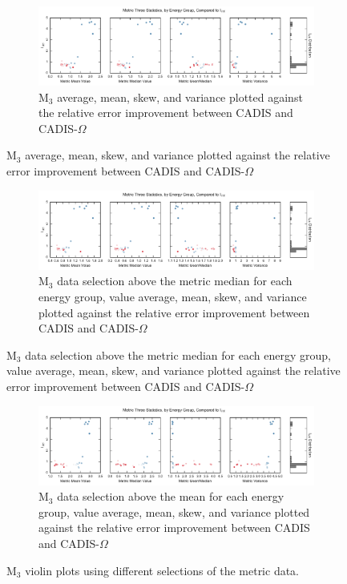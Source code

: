 \begin{figure}[htb]
  \centering
  \begin{subfigure}[t]{\textwidth}
    \centering
    \includegraphics[width=\linewidth]{./chapters/characterization_probs/figures/sample_data/metric_three_err_stats_full.pdf}
    \caption{M$_3$ average, mean, skew, and variance plotted against the
    relative error improvement between CADIS and CADIS-$\Omega$}
    \label{fig:samplestatsfullM3}
  \end{subfigure}
\end{figure}
\begin{figure}[htb]\ContinuedFloat
  \centering
  \begin{subfigure}[t]{\textwidth}
    \centering
    \includegraphics[width=\linewidth]{./chapters/characterization_probs/figures/sample_data/metric_three_err_stats_median.pdf}
    \caption{M$_3$ data selection above the metric median for each energy group,
      value average, mean, skew, and variance plotted against the
    relative error improvement between CADIS and CADIS-$\Omega$}
    \label{fig:samplestatsfullM3}
  \end{subfigure}
\end{figure}
\begin{figure}[htb]\ContinuedFloat
  \centering
  \begin{subfigure}[t]{\textwidth}
    \centering
    \includegraphics[width=\linewidth]{./chapters/characterization_probs/figures/sample_data/metric_three_err_stats_mean.pdf}
    \caption{M$_3$ data selection above the mean for each energy group,
      value average, mean, skew, and variance plotted against the
    relative error improvement between CADIS and CADIS-$\Omega$}
    \label{fig:samplestatsfullM3}
  \end{subfigure}
  \caption[M$_3$ violin plots using different selections of the metric data.]
  {M$_3$ violin plots using different selections of the metric data.}
  \label{fig:samplestrips}
\end{figure}
